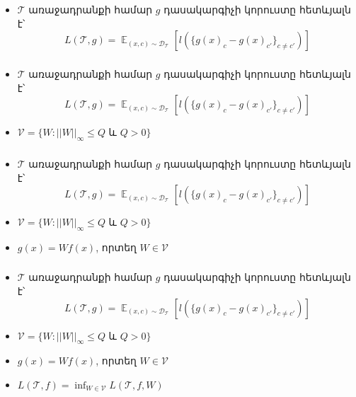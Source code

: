 \documentclass[10pt]{beamer}
\DeclareMathOperator*{\E}{\mathbb{E}}
\begin{document}
\begin{frame}[t]
\frametitle{}
\end{frame}


\begin{frame}[t]
\frametitle{}
\begin{itemize}
\vspace{5mm}
\item \armfont $\mathcal{T}$ առաջադրանքի համար $g$ դասակարգիչի կորուստը հետևյալն է՝
$$L(\mathcal{T}, g) = \E_{(x, c) \sim \mathcal{D}_{\mathcal{T}}} \left [ l(\{ g(x)_c-g(x)_{c'}\}_{c \neq c'}  ) \right ]$$

\end{itemize}
\end{frame}

\begin{frame}[t]
\frametitle{}
\begin{itemize}
\vspace{5mm}
\item \armfont $\mathcal{T}$ առաջադրանքի համար $g$ դասակարգիչի կորուստը հետևյալն է՝
$$L(\mathcal{T}, g) = \E_{(x, c) \sim \mathcal{D}_{\mathcal{T}}} \left [ l(\{ g(x)_c-g(x)_{c'}\}_{c \neq c'}  ) \right ]$$
\item $\mathcal{V} = \{W: ||W||_{\infty} \leq Q \text{ և } Q > 0\}$


\end{itemize}
\end{frame}

\begin{frame}[t]
\frametitle{}
\begin{itemize}
\vspace{5mm}
\item \armfont $\mathcal{T}$ առաջադրանքի համար $g$ դասակարգիչի կորուստը հետևյալն է՝
$$L(\mathcal{T}, g) = \E_{(x, c) \sim \mathcal{D}_{\mathcal{T}}} \left [ l(\{ g(x)_c-g(x)_{c'}\}_{c \neq c'}  ) \right ]$$
\item $\mathcal{V} = \{W: ||W||_{\infty} \leq Q \text{ և } Q > 0\}$
\item  $g(x) = Wf(x)$, որտեղ $W \in \mathcal{V}$

\end{itemize}
\end{frame}

\begin{frame}[t]
\frametitle{}
\begin{itemize}
\vspace{5mm}
\item \armfont $\mathcal{T}$ առաջադրանքի համար $g$ դասակարգիչի կորուստը հետևյալն է՝
$$L(\mathcal{T}, g) = \E_{(x, c) \sim \mathcal{D}_{\mathcal{T}}} \left [ l(\{ g(x)_c-g(x)_{c'}\}_{c \neq c'}  ) \right ]$$
\item $\mathcal{V} = \{W: ||W||_{\infty} \leq Q \text{ և } Q > 0\}$
\item  $g(x) = Wf(x)$, որտեղ $W \in \mathcal{V}$

\item $L(\mathcal{T}, f) = \inf_{W \in \mathcal{V}} L(\mathcal{T}, f, W)$

\end{itemize}
\end{frame}
\end{document}
